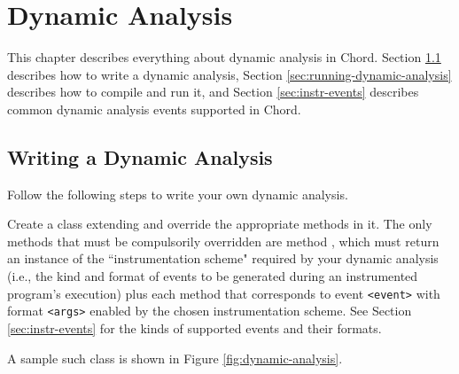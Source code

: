 \chapter{Dynamic Analysis}
\label{chap:dynamic-analysis}

This chapter describes everything about dynamic analysis in Chord.
Section \ref{sec:writing-dynamic-analysis} describes how to write a dynamic analysis,
Section \ref{sec:running-dynamic-analysis} describes how to compile and run it,
and Section \ref{sec:instr-events} describes common dynamic analysis events
supported in Chord.

\section{Writing a Dynamic Analysis}
\label{sec:writing-dynamic-analysis}

Follow the following steps to write your own dynamic analysis.

Create a class extending  and override
the appropriate methods in it.
The only methods that must be compulsorily overridden are method ,
which must return an instance of the ``instrumentation scheme" required by
your dynamic analysis (i.e., the kind and format of events to be generated during an
instrumented program's execution)
plus each  method that corresponds to event {\tt <event>}
with format {\tt <args>} enabled by the chosen instrumentation scheme.
See Section \ref{sec:instr-events} for the kinds of supported events and their formats.

A sample such class  is shown in Figure \ref{fig:dynamic-analysis}.

